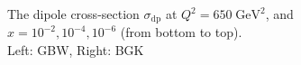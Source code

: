 \documentclass[11pt]{article}
\begin{document}
\begin{figure}[t]
\caption{The dipole cross-section $\sigma_{\mathrm{dp}}$ at $Q^2=650\;\mathrm{GeV^2}$, and $x=10^{-2},10^{-4}, 10^{-6}$ (from bottom to top).\\Left: GBW, Right: BGK}
\label{dipole}
\end{figure}
\end{document}
